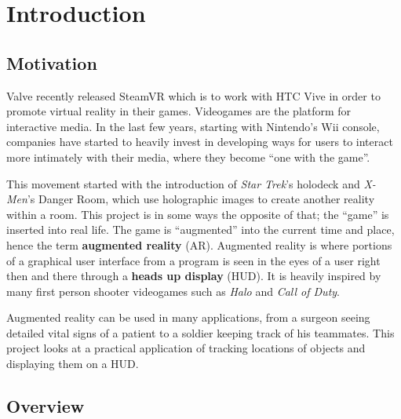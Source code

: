 
\chapter{Introduction} %

\label{Introduction} %


\section{Motivation}

Valve recently released SteamVR which is to work with HTC Vive in order to promote virtual reality in their games. Videogames are the platform for interactive media. In the last few years, starting with Nintendo’s Wii console, companies have started to heavily invest in developing ways for users to interact more intimately with their media, where they become ``one with the game”. 

This movement started with the introduction of \emph{Star Trek}’s holodeck and \emph{X-Men}’s Danger Room, which use holographic images to create another reality within a room. This project is in some ways the opposite of that; the ``game'' is inserted into real life. The game is “augmented” into the current time and place, hence the term \textbf{augmented reality} (AR). Augmented reality is where portions of a graphical user interface from a program is seen in the eyes of a user right then and there through a \textbf{heads up display} (HUD). It is heavily inspired by many first person shooter videogames such as \emph{Halo} and \emph{Call of Duty}. 

Augmented reality can be used in many applications, from a surgeon seeing detailed vital signs of a patient to a soldier keeping track of his teammates. This project looks at a practical application of tracking locations of objects and displaying them on a HUD.

\section{Overview}

